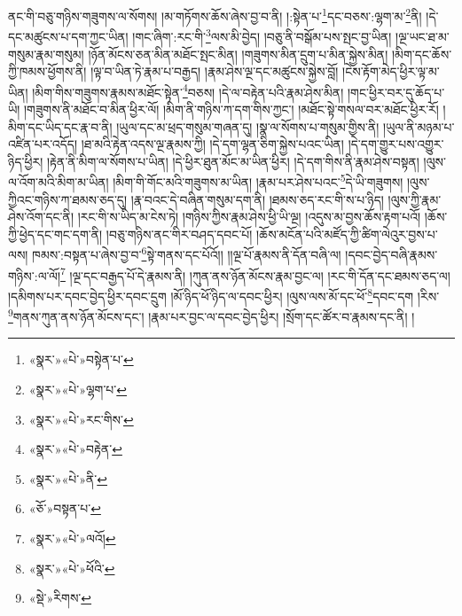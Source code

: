 ནང་གི་བཅུ་གཉིས་གཟུགས་ལ་སོགས། །མ་གཏོགས་ཆོས་ཞེས་བྱ་བ་ནི། །:སྟེན་པ་\footnote{«སྣར་»«པེ་»བསྟེན་པ་}དང་བཅས་:ལྷག་མ་\footnote{«སྣར་»«པེ་»ལྷག་པ་}ནི། །དེ་དང་མཚུངས་པ་དག་ཀྱང་ཡིན། །གང་ཞིག་:རང་གི་\footnote{«སྣར་»«པེ་»རང་གིས་}ལས་མི་བྱེད། །བཅུ་ནི་བསྒོམ་པས་སྤང་བྱ་ཡིན། །ལྔ་ཡང་ཐ་མ་གསུམ་རྣམ་གསུམ། །ཉོན་མོངས་ཅན་མིན་མཐོང་སྤང་མིན། །གཟུགས་མིན་དྲུག་པ་མིན་སྐྱེས་མིན། །མིག་དང་ཆོས་ཀྱི་ཁམས་ཕྱོགས་ནི། །ལྟ་བ་ཡིན་ཏེ་རྣམ་པ་བརྒྱད། །རྣམ་ཤེས་ལྔ་དང་མཚུངས་སྐྱེས་བློ། །ངེས་རྟོག་མེད་ཕྱིར་ལྟ་མ་ཡིན། །མིག་གིས་གཟུགས་རྣམས་མཐོང་སྟེན་\footnote{«སྣར་»«པེ་»བརྟེན་}བཅས། །དེ་ལ་བརྟེན་པའི་རྣམ་ཤེས་མིན། །གང་ཕྱིར་བར་དུ་ཆོད་པ་ཡི། །གཟུགས་ནི་མཐོང་བ་མིན་ཕྱིར་ལོ། །མིག་ནི་གཉིས་ཀ་དག་གིས་ཀྱང་། །མཐོང་སྟེ་གསལ་བར་མཐོང་ཕྱིར་རོ། །མིག་དང་ཡིད་དང་རྣ་བ་ནི། །ཡུལ་དང་མ་ཕྲད་གསུམ་གཞན་དུ། །སྣ་ལ་སོགས་པ་གསུམ་གྱིས་ནི། །ཡུལ་ནི་མཉམ་པ་འཛིན་པར་འདོད། །ཐ་མའི་རྟེན་འདས་ལྔ་རྣམས་ཀྱི། །དེ་དག་ལྷན་ཅིག་སྐྱེས་པའང་ཡིན། །དེ་དག་གྱུར་པས་འགྱུར་ཉིད་ཕྱིར། །རྟེན་ནི་མིག་ལ་སོགས་པ་ཡིན། །དེ་ཕྱིར་ཐུན་མོང་མ་ཡིན་ཕྱིར། །དེ་དག་གིས་ནི་རྣམ་ཤེས་བསྟན། །ལུས་ལ་འོག་མའི་མིག་མ་ཡིན། །མིག་གི་གོང་མའི་གཟུགས་མ་ཡིན། །རྣམ་པར་ཤེས་པའང་\footnote{«སྣར་»«པེ་»ནི་}དེ་ཡི་གཟུགས། །ལུས་ཀྱིའང་གཉིས་ཀ་ཐམས་ཅད་དུ། །རྣ་བའང་དེ་བཞིན་གསུམ་དག་ནི། །ཐམས་ཅད་རང་གི་ས་པ་ཉིད། །ལུས་ཀྱི་རྣམ་ཤེས་འོག་དང་ནི། །རང་གི་ས་ཡིད་མ་ངེས་ཏེ། །གཉིས་ཀྱིས་རྣམ་ཤེས་ཕྱི་ཡི་ལྔ། །འདུས་མ་བྱས་ཆོས་རྟག་པའོ། །ཆོས་ཀྱི་ཕྱེད་དང་གང་དག་ནི། །བཅུ་གཉིས་ནང་གིར་བཤད་དབང་པོ། །ཆོས་མངོན་པའི་མཛོད་ཀྱི་ཚིག་ལེའུར་བྱས་པ་ལས། ཁམས་:བསྟན་པ་ཞེས་བྱ་བ་\footnote{«ཅོ་»བསྟན་པ་}སྟེ་གནས་དང་པོའོ།། །།ལྔ་པོ་རྣམས་ནི་དོན་བཞི་ལ། །དབང་བྱེད་བཞི་རྣམས་གཉིས་:ལ་ལོ།\footnote{«སྣར་»«པེ་»ལའོ།} །ལྔ་དང་བརྒྱད་པོ་དེ་རྣམས་ནི། །ཀུན་ནས་ཉོན་མོངས་རྣམ་བྱང་ལ། །རང་གི་དོན་དང་ཐམས་ཅད་ལ། །དམིགས་པར་དབང་བྱེད་ཕྱིར་དབང་དྲུག །མོ་ཉིད་ཕོ་ཉིད་ལ་དབང་ཕྱིར། །ལུས་ལས་མོ་དང་ཕོ་\footnote{«སྣར་»«པེ་»ཕོའི་}དབང་དག །རིས་\footnote{«སྡེ་»རིགས་}གནས་ཀུན་ནས་ཉོན་མོངས་དང་། །རྣམ་པར་བྱང་ལ་དབང་བྱེད་ཕྱིར། །སྲོག་དང་ཚོར་བ་རྣམས་དང་ནི། །
